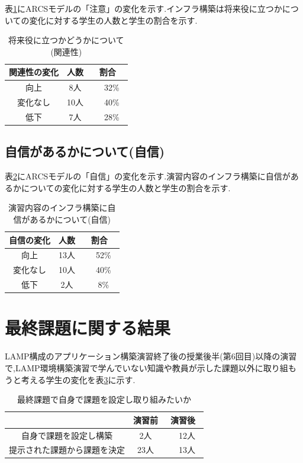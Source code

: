 \documentclass[11pt, a4paper]{jreport}
\begin{document}
表\ref{tab:yakudatu}にARCSモデルの「注意」の変化を示す.インフラ構築は将来役に立つかについての変化に対する学生の人数と学生の割合を示す.

\begin{table}[H]
\caption{将来役に立つかどうかについて(関連性)}
\label{tab:yakudatu}
\centering
\begin{tabular}{|c|c|c|} \hline
関連性の変化 & 人数 & 割合\\ \hline
向上 & 8人 &　32\%　\\ \hline
変化なし & 10人 &　40\%　\\ \hline
低下 & 7人 &　28\%　\\ \hline
\end{tabular}
\end{table}

\subsection{自信があるかについて(自信)}

表\ref{tab:zisin}にARCSモデルの「自信」の変化を示す.演習内容のインフラ構築に自信があるかについての変化に対する学生の人数と学生の割合を示す.

\begin{table}[H]
\caption{演習内容のインフラ構築に自信があるかについて(自信)}
\label{tab:zisin}
\centering
\begin{tabular}{|c|c|c|} \hline
自信の変化 & 人数 & 割合\\ \hline
向上 & 13人 &　52\%　\\ \hline
変化なし & 10人 &　40\%　\\ \hline
低下 & 2人 &　8\%　\\ \hline
\end{tabular}
\end{table}

\section{最終課題に関する結果} 

LAMP構成のアプリケーション構築演習終了後の授業後半(第6回目)以降の演習で,LAMP環境構築演習で学んでいない知識や教員が示した課題以外に取り組もうと考える学生の変化を表\ref{tab:saisyuu}に示す.

\begin{table}[H]
\caption{最終課題で自身で課題を設定し取り組みたいか}
\label{tab:saisyuu}
\centering
\begin{tabular}{|c|c|c|} \hline
 & 演習前 & 演習後\\ \hline
自身で課題を設定し構築 & 2人 &　12人　\\ \hline
提示された課題から課題を決定 & 23人 &　13人　\\ \hline
\end{tabular}
\end{table}
\end{document}
